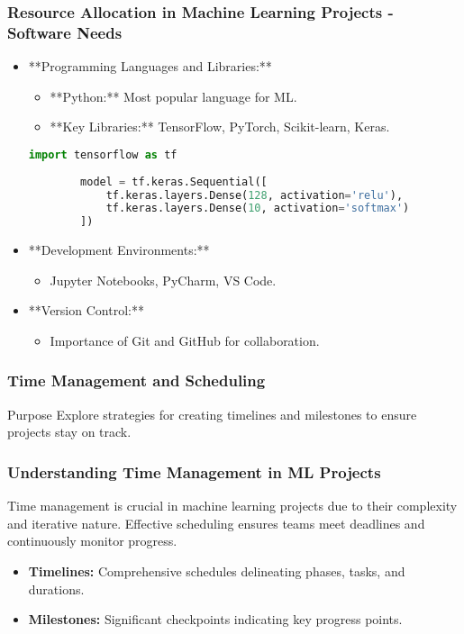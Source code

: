 \documentclass[aspectratio=169]{beamer}
\begin{document}
\begin{frame}[fragile]
    \frametitle{Resource Allocation in Machine Learning Projects - Software Needs}
    \begin{itemize}
        \item **Programming Languages and Libraries:**
        \begin{itemize}
            \item **Python:** Most popular language for ML.
            \item **Key Libraries:** TensorFlow, PyTorch, Scikit-learn, Keras.
        \end{itemize}
        
        \begin{lstlisting}[language=Python]
        import tensorflow as tf
        
        model = tf.keras.Sequential([
            tf.keras.layers.Dense(128, activation='relu'),
            tf.keras.layers.Dense(10, activation='softmax')
        ])
        \end{lstlisting}
        
        \item **Development Environments:**
        \begin{itemize}
            \item Jupyter Notebooks, PyCharm, VS Code.
        \end{itemize}
        
        \item **Version Control:**
        \begin{itemize}
            \item Importance of Git and GitHub for collaboration.
        \end{itemize}
    \end{itemize}
\end{frame}

\begin{frame}[fragile]
    \frametitle{Time Management and Scheduling}
    \begin{block}{Purpose}
        Explore strategies for creating timelines and milestones to ensure projects stay on track.
    \end{block}
\end{frame}

\begin{frame}[fragile]
    \frametitle{Understanding Time Management in ML Projects}
    Time management is crucial in machine learning projects due to their complexity and iterative nature. 
    Effective scheduling ensures teams meet deadlines and continuously monitor progress.

    \begin{itemize}
        \item \textbf{Timelines:} Comprehensive schedules delineating phases, tasks, and durations.
        \item \textbf{Milestones:} Significant checkpoints indicating key progress points.
    \end{itemize}
\end{frame}
\end{document}
